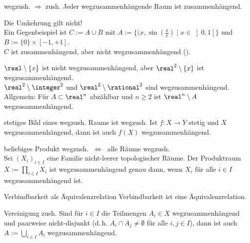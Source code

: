 \begin{Satz}{wegzush. $\Rightarrow$ zush.}
    Jeder wegzusammenhängende Raum ist zusammenhängend.
\end{Satz}

\begin{Bem}
    Die Umkehrung gilt nicht! \\
    Ein Gegenbeispiel ist $C := A \cup B$ mit
    $A := \{(x, \sin(\frac{\pi}{x}) \;|\; x \in \left]0, 1\right]\}$ und
    $B := \{0\} \times [-1, +1]$. \\
    $C$ ist zusammenhängend, aber nicht wegzusammenhängend
    ().
\end{Bem}

\begin{Bsp}
    $\real \setminus \{x\}$ ist nicht wegzusammenhängend,
    aber $\real^2 \setminus \{x\}$ ist wegzusammenhängend. \\
    $\real^2 \setminus \integer^2$ und $\real^2 \setminus \rational^2$
    sind wegzusammenhängend. \\
    Allgemein: Für $A \subset \real^n$ abzählbar und $n \ge 2$ ist
    $\real^n \setminus A$ wegzusammenhängend.
\end{Bsp}

\linie
\pagebreak

\begin{Satz}{stetiges Bild eines wegzush. Raums ist wegzush.}
    Ist $f\colon X \rightarrow Y$ stetig und $X$ wegzusammenhängend,
    dann ist auch $f(X)$ wegzusammenhängend.
\end{Satz}

\begin{Satz}{beliebiges Produkt wegzush. $\;\Leftrightarrow\;$
             alle Räume wegzush.} \\
    Sei $(X_i)_{i \in I}$ eine Familie nicht-leerer topologischer Räume.
    Der Produktraum $X := \prod_{i \in I} X_i$ ist wegzusammenhängend
    genau dann, wenn $X_i$ für alle $i \in I$ wegzusammenhängend ist.
\end{Satz}

\linie

\begin{Satz}{Verbindbarkeit als Äquivalenzrelation}
    Verbindbarkeit ist eine Äquivalenzrelation.
\end{Satz}

\begin{Lemma}{Vereinigung zush.}
    Sind für $i \in I$ die Teilmengen $A_i \in X$ wegzusammenhängend und
    paarweise nicht-disjunkt
    (d.\,h. $A_i \cap A_j \not= \emptyset$ für alle $i, j \in I$),
    dann ist auch $A := \bigcup_{i \in I} A_i$ wegzusammenhängend.
\end{Lemma}

